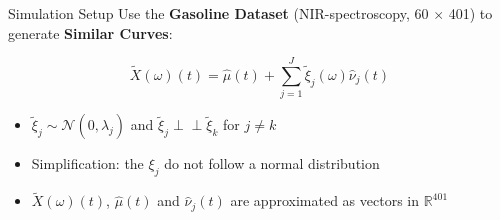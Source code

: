 \documentclass{beamer}
\newcommand{\independent}{\perp\!\!\!\!\perp}
\begin{document}
	\begin{frame}{Simulation Setup}
		Use the \textbf{Gasoline Dataset} (NIR-spectroscopy, 60 $\times$ 401) to generate \textbf{Similar Curves}:
	
		$$\tilde{X}(\omega)(t) = \hat{\mu}(t) + \sum_{j = 1}^{J} \tilde{\xi}_j(\omega) \hat{\nu}_j(t)$$ 
		\vspace{0.2cm}
		
		\begin{itemize}
			\item $\tilde{\xi}_{j} \sim \mathcal{N}(0,\hat{\lambda}_j)$ and $\tilde{\xi}_{j} \independent \tilde{\xi}_{k}$ for $j \neq k$
			\item Simplification: the $\xi_{j}$ do not follow a normal distribution
			\item $\tilde{X}(\omega)(t)$, $\hat{\mu}(t)$ and $\hat{\nu}_j(t)$ are approximated as vectors in $\mathbb{R}^{401}$
		\end{itemize}
		
	\end{frame}
	
\end{document}
